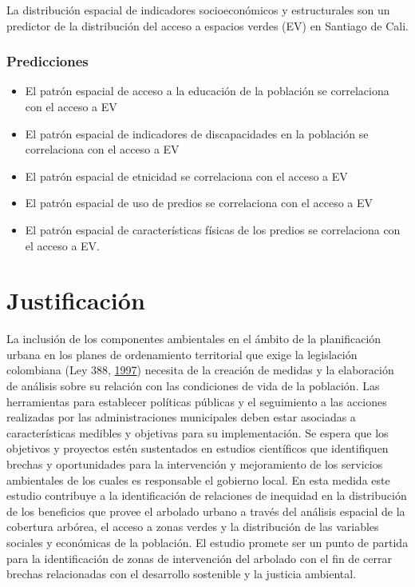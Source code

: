 \documentclass[12pt,a4paper,openany]{book}
\providecommand{\tightlist}{%
  \setlength{\itemsep}{0pt}\setlength{\parskip}{0pt}}
\theoremstyle{definition}
\theoremstyle{definition}
\theoremstyle{definition}
\theoremstyle{remark}
\begin{document}
La distribución espacial de indicadores socioeconómicos y estructurales
son un predictor de la distribución del acceso a espacios verdes (EV) en
Santiago de Cali.

\subsubsection{Predicciones}\label{predicciones-1}

\begin{itemize}
\tightlist
\item
  El patrón espacial de acceso a la educación de la población se
  correlaciona con el acceso a EV
\item
  El patrón espacial de indicadores de discapacidades en la población se
  correlaciona con el acceso a EV
\item
  El patrón espacial de etnicidad se correlaciona con el acceso a EV
\item
  El patrón espacial de uso de predios se correlaciona con el acceso a
  EV
\item
  El patrón espacial de características físicas de los predios se
  correlaciona con el acceso a EV.
\end{itemize}

\section{Justificación}\label{justificacion}

La inclusión de los componentes ambientales en el ámbito de la
planificación urbana en los planes de ordenamiento territorial que exige
la legislación colombiana (Ley 388,
\protect\hyperlink{ref-ley388col}{1997}) necesita de la creación de
medidas y la elaboración de análisis sobre su relación con las
condiciones de vida de la población. Las herramientas para establecer
políticas públicas y el seguimiento a las acciones realizadas por las
administraciones municipales deben estar asociadas a características
medibles y objetivas para su implementación. Se espera que los objetivos
y proyectos estén sustentados en estudios científicos que identifiquen
brechas y oportunidades para la intervención y mejoramiento de los
servicios ambientales de los cuales es responsable el gobierno local. En
esta medida este estudio contribuye a la identificación de relaciones de
inequidad en la distribución de los beneficios que provee el arbolado
urbano a través del análisis espacial de la cobertura arbórea, el acceso
a zonas verdes y la distribución de las variables sociales y económicas
de la población. El estudio promete ser un punto de partida para la
identificación de zonas de intervención del arbolado con el fin de
cerrar brechas relacionadas con el desarrollo sostenible y la justicia
ambiental.
\end{document}
